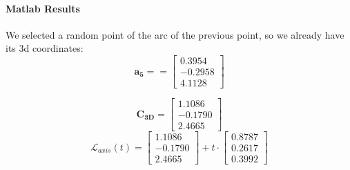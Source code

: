 \documentclass[a4paper,11pt]{article}
\newcommand{\vect}[1]{\mathbf{#1}}  %
\begin{document}
\paragraph{Matlab Results}
We selected a random point of the arc of the previous point, so we already have its 3d coordinates:
    \[
    \vect{a_5} =  = \begin{bmatrix}
        0.3954 \\
        -0.2958 \\
        4.1128
    \end{bmatrix}
    \]

    \begin{equation}
    \vect{C_{3D}} = 
    \begin{bmatrix}
        1.1086 \\
        -0.1790 \\
        2.4665
    \end{bmatrix}
\end{equation}
\[\mathcal{L}_{axis}(t) = \begin{bmatrix}
        1.1086 \\
        -0.1790 \\
        2.4665
    \end{bmatrix} + t \cdot \begin{bmatrix}
        0.8787 \\
        0.2617 \\
        0.3992
    \end{bmatrix}\]
\end{document}
